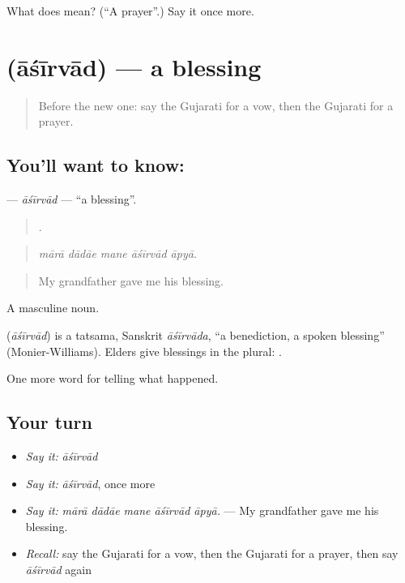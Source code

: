\begin{tcolorbox}[breakable,colback=teal!4,colframe=teal!35!black,title={Before you move on}]
What does  mean? (\textquotedblleft{}A prayer\textquotedblright{}.) Say it once more.
\end{tcolorbox}
\section[\texorpdfstring{\gu{આશીર્વાદ} (āśīrvād)}{આશીર્વાદ (āśīrvād)}]{ (āśīrvād) — a blessing}

\label{lesson:GU-C331-asirvad}



\begin{quote}
Before the new one: say the Gujarati for a vow, then the Gujarati for a prayer.
\end{quote}

\subsection*{You'll want to know: }
\textbf{} — \emph{āśīrvād} — \textquotedblleft{}a blessing\textquotedblright{}.

\begin{quote}
    .
\end{quote}

\begin{quote}
\emph{mārā dādāe mane āśīrvād āpyā.}
\end{quote}

\begin{quote}
My grandfather gave me his blessing.
\end{quote}

A masculine noun.

\begin{cousinweb}
\textbf{} (\emph{āśīrvād}) is a tatsama, Sanskrit \emph{āśīrvāda}, \textquotedblleft{}a benediction, a spoken blessing\textquotedblright{} (Monier-Williams). Elders give blessings in the plural: \textbf{ }.
\end{cousinweb}

\begin{grammarlens}[title={What you've built}]
One more word for telling what happened.
\end{grammarlens}

\subsection*{Your turn}
\begin{itemize}
\raggedright
  \item \emph{Say it:} \emph{āśīrvād}
  \item \emph{Say it:} \emph{āśīrvād}, once more
  \item \emph{Say it:} \emph{mārā dādāe mane āśīrvād āpyā.} — My grandfather gave me his blessing.
  \item \emph{Recall:} say the Gujarati for a vow, then the Gujarati for a prayer, then say \emph{āśīrvād} again
\end{itemize}

